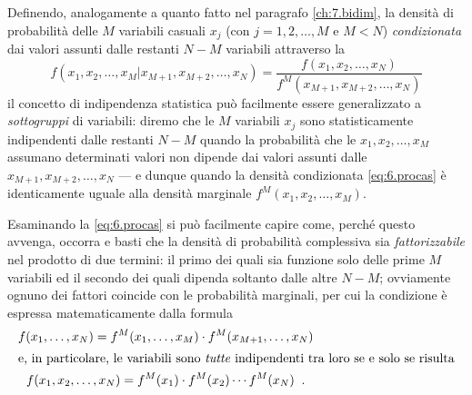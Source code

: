 %
Definendo, analogamente a quanto fatto nel paragrafo
\ref{ch:7.bidim}, la densit\`a di probabilit\`a delle $M$
variabili casuali $x_j$ (con $j=1, 2,\ldots ,M$ e $M<N$)
\emph{condizionata} dai valori assunti dalle restanti $N-M$
variabili attraverso la
\begin{equation} \label{eq:6.procas}
  f(x_1, x_2,\ldots,x_M | x_{M+1}, x_{M+2},\ldots,x_N)
  = \frac{f(x_1, x_2,\ldots,x_N)}{f^M(x_{M+1},
  x_{M+2},\ldots,x_N)}
\end{equation}%
%
%
il concetto di indipendenza statistica pu\`o facilmente
essere generalizzato a \emph{sottogruppi} di variabili:
diremo che le $M$ variabili $x_j$ sono statisticamente
indipendenti dalle restanti $N - M$ quando la probabilit\`a
che le $x_1, x_2, \ldots, x_M$ assumano determinati valori
non dipende dai valori assunti dalle $x_{M+1}, x_{M+2},
\ldots, x_N$ --- e dunque quando la densit\`a condizionata
\eqref{eq:6.procas} \`e identicamente uguale alla densit\`a
marginale $f^M(x_1, x_2,\ldots,x_M)$.

Esaminando la \eqref{eq:6.procas} si pu\`o facilmente capire
come, perch\'e questo avvenga, occorra e basti che la
densit\`a di probabilit\`a complessiva sia
\emph{fattorizzabile} nel prodotto di due termini: il primo
dei quali sia funzione solo delle prime $M$ variabili ed il
secondo dei quali dipenda soltanto dalle altre $N-M$;
ovviamente ognuno dei fattori coincide con le probabilit\`a
marginali, per cui la condizione \`e espressa
matematicamente dalla formula
\begin{gather}
  f(x_1,\ldots, x_N) = f^M (x_1,\ldots, x_M) \cdot
    f^M(x_{M+1},\ldots, x_N) \notag \\
  \intertext{e, in particolare, le variabili sono
    \emph{tutte} indipendenti tra loro se e solo se
    risulta}
  f(x_1, x_2,\ldots, x_N) = f^M (x_1) \cdot f^M (x_2)
    \cdots f^M (x_N) \peq . \label{eq:6.instmu}
\end{gather}%

